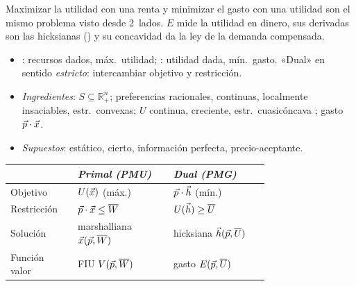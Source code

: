 \documentclass{article}
\begin{document}
\begin{columnas}
\begin{ideaclave}
Maximizar la utilidad con una renta y minimizar el gasto con una utilidad son el mismo problema visto desde 2~lados. $E$ mide la utilidad en dinero, sus derivadas son las hicksianas () y su concavidad da la ley de la demanda compensada.
\end{ideaclave}

\begin{itemize}
\item {}: recursos dados, máx.\ utilidad; : utilidad dada, mín.\ gasto. «Dual» en sentido \emph{estricto}: intercambiar objetivo y restricción.
\item \emph{Ingredientes}: $S\subseteq\mathbb{R}^n_+$; preferencias racionales, continuas, localmente insaciables, estr.\ convexas; $U$ continua, creciente, estr.\ cuasicóncava ; gasto $\vec{p}\cdot\vec{x}$.
\item \emph{Supuestos}: estático, cierto, información perfecta, precio-aceptante.
\end{itemize}
{\centering\small\renewcommand{\arraystretch}{1.15}\setlength{\tabcolsep}{3pt}%
\begin{tabular}{@{}l>{\raggedright\arraybackslash}p{0.37\linewidth}>{\raggedright\arraybackslash}p{0.37\linewidth}@{}}
\toprule
 & \textit{Primal (PMU)} & \textit{Dual (PMG)}\\
\midrule
Objetivo & $U(\vec{x})$ (máx.) & $\vec{p}\cdot\vec{h}$ (mín.)\\
Restricción & $\vec{p}\cdot\vec{x}\leq\overline{W}$ & $U(\vec{h})\geq\overline{U}$\\
Solución & marshalliana $\vec{x}(\vec{p},\overline{W})$ & hicksiana $\vec{h}(\vec{p},\overline{U})$\\
Función valor & FIU $V(\vec{p},\overline{W})$ & gasto $E(\vec{p},\overline{U})$\\
\bottomrule
\end{tabular}\par}


\end{columnas}
\end{document}
